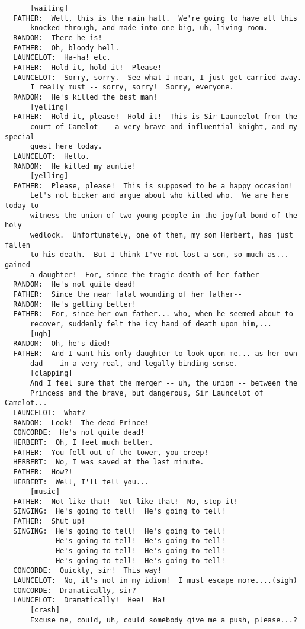 \documentclass{article}
\begin{document}
\begin{verbatim}
      [wailing]
  FATHER:  Well, this is the main hall.  We're going to have all this
      knocked through, and made into one big, uh, living room.
  RANDOM:  There he is!
  FATHER:  Oh, bloody hell.
  LAUNCELOT:  Ha-ha! etc.
  FATHER:  Hold it, hold it!  Please!
  LAUNCELOT:  Sorry, sorry.  See what I mean, I just get carried away.
      I really must -- sorry, sorry!  Sorry, everyone.
  RANDOM:  He's killed the best man!
      [yelling]
  FATHER:  Hold it, please!  Hold it!  This is Sir Launcelot from the
      court of Camelot -- a very brave and influential knight, and my special
      guest here today.
  LAUNCELOT:  Hello.
  RANDOM:  He killed my auntie!
      [yelling]
  FATHER:  Please, please!  This is supposed to be a happy occasion!
      Let's not bicker and argue about who killed who.  We are here today to
      witness the union of two young people in the joyful bond of the holy
      wedlock.  Unfortunately, one of them, my son Herbert, has just fallen
      to his death.  But I think I've not lost a son, so much as... gained
      a daughter!  For, since the tragic death of her father--
  RANDOM:  He's not quite dead!
  FATHER:  Since the near fatal wounding of her father--
  RANDOM:  He's getting better!
  FATHER:  For, since her own father... who, when he seemed about to
      recover, suddenly felt the icy hand of death upon him,...
      [ugh]
  RANDOM:  Oh, he's died!
  FATHER:  And I want his only daughter to look upon me... as her own
      dad -- in a very real, and legally binding sense.
      [clapping]
      And I feel sure that the merger -- uh, the union -- between the
      Princess and the brave, but dangerous, Sir Launcelot of Camelot...
  LAUNCELOT:  What?
  RANDOM:  Look!  The dead Prince!
  CONCORDE:  He's not quite dead!
  HERBERT:  Oh, I feel much better.
  FATHER:  You fell out of the tower, you creep!
  HERBERT:  No, I was saved at the last minute.
  FATHER:  How?!
  HERBERT:  Well, I'll tell you...
      [music]
  FATHER:  Not like that!  Not like that!  No, stop it!
  SINGING:  He's going to tell!  He's going to tell!
  FATHER:  Shut up!
  SINGING:  He's going to tell!  He's going to tell!
            He's going to tell!  He's going to tell!
            He's going to tell!  He's going to tell!
            He's going to tell!  He's going to tell!
  CONCORDE:  Quickly, sir!  This way!
  LAUNCELOT:  No, it's not in my idiom!  I must escape more....(sigh)
  CONCORDE:  Dramatically, sir?
  LAUNCELOT:  Dramatically!  Hee!  Ha!
      [crash]
      Excuse me, could, uh, could somebody give me a push, please...?


\end{verbatim}
\end{document}
